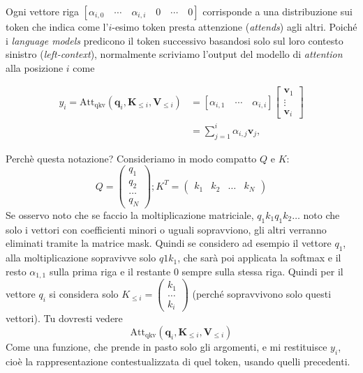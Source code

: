 Ogni vettore riga $\left[ \alpha_{i,0} \quad \cdots \quad \alpha_{i,i} \quad 0 \quad \cdots \quad 0 \right]$ corrisponde a una distribuzione sui token che indica come l'$i$-esimo token presta attenzione (\textit{attends}) agli altri. Poiché i \textit{language models} predicono il token successivo basandosi solo sul loro contesto sinistro (\textit{left-context}), normalmente scriviamo l'output del modello di \textit{attention} alla posizione $i$ come

\begin{align}
    y_i = \text{Att}_{\text{qkv}}(\mathbf{q}_i, \mathbf{K}_{\le i}, \mathbf{V}_{\le i}) &= \left[ \alpha_{i,1} \quad \cdots \quad \alpha_{i,i} \right] \begin{bmatrix} \mathbf{v}_1 \\ \vdots \\ \mathbf{v}_i \end{bmatrix} \nonumber \\
    &= \sum_{j=1}^{i} \alpha_{i,j}\mathbf{v}_j,
\end{align}

\begin{observation}{Perchè questa notazione?}
    Consideriamo in modo compatto $Q$ e $K$:
    \[
        Q = \begin{pmatrix} q_1 \\ q_2 \\ \dots \\ q_N \end{pmatrix};
        K^T = \begin{pmatrix} k_1 & k_2 & \dots & k_N \end{pmatrix}
    \]
    Se osservo noto che se faccio la moltiplicazione matriciale, $q_1 k_1 q_1 k_2 \dots$ noto che solo i vettori con coefficienti minori o uguali sopravviono,
    gli altri verranno eliminati tramite la matrice mask.
    Quindi se considero ad esempio il vettore $q_1$, alla moltiplicazione sopravivve solo $q1 k_1$, che sarà poi applicata la softmax e il resto $\alpha_{1,1}$ sulla prima riga e il restante 0 sempre sulla stessa riga.
    Quindi per il vettore $q_i$ si considera solo $K_{\leq i} = \begin{pmatrix} k_1 \\ \dots \\ k_i \end{pmatrix}$ (perché sopravvivono solo questi vettori).
    Tu dovresti vedere
    \[
    \text{Att}_{\text{qkv}}(\mathbf{q}_i, \mathbf{K}_{\le i}, \mathbf{V}_{\le i})
    \]
    Come una funzione, che prende in pasto solo gli argomenti, e mi restituisce $y_i$, cioè la rappresentazione contestualizzata di quel token, usando quelli precedenti.

\end{observation}


